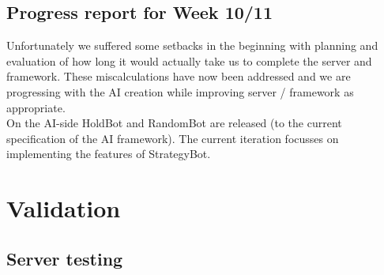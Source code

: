 \documentclass[pdftex,12pt,a4paper]{report}
\begin{document}
\subsection{Progress report for Week 10/11}
Unfortunately we suffered some setbacks in the beginning with planning
and evaluation of how long it would actually take us to complete the
server and framework. These miscalculations have now been addressed
and we are progressing with the AI creation while improving server /
framework as appropriate.  \\ On the AI-side HoldBot and RandomBot are
released (to the current specification of the AI framework). The
current iteration focusses on implementing the features of
StrategyBot.


\pagebreak

\section{Validation}

\subsection{Server testing}
\end{document}
